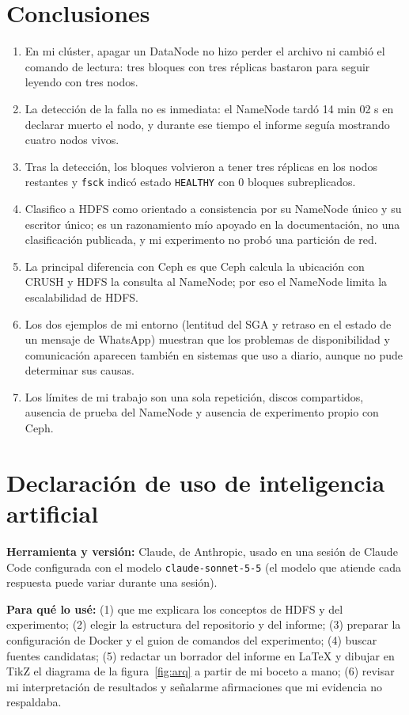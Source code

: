 \documentclass[11pt,a4paper]{article}
\begin{document}
\section{Conclusiones}
\begin{enumerate}
  \item En mi clúster, apagar un DataNode no hizo perder el archivo ni cambió el comando de lectura: tres bloques con tres réplicas bastaron para seguir leyendo con tres nodos.
  \item La detección de la falla no es inmediata: el NameNode tardó 14 min 02 s en declarar muerto el nodo, y durante ese tiempo el informe seguía mostrando cuatro nodos vivos.
  \item Tras la detección, los bloques volvieron a tener tres réplicas en los nodos restantes y \texttt{fsck} indicó estado \texttt{HEALTHY} con 0 bloques subreplicados.
  \item Clasifico a HDFS como orientado a consistencia por su NameNode único y su escritor único; es un razonamiento mío apoyado en la documentación, no una clasificación publicada, y mi experimento no probó una partición de red.
  \item La principal diferencia con Ceph es que Ceph calcula la ubicación con CRUSH y HDFS la consulta al NameNode; por eso el NameNode limita la escalabilidad de HDFS.
  \item Los dos ejemplos de mi entorno (lentitud del SGA y retraso en el estado de un mensaje de WhatsApp) muestran que los problemas de disponibilidad y comunicación aparecen también en sistemas que uso a diario, aunque no pude determinar sus causas.
  \item Los límites de mi trabajo son una sola repetición, discos compartidos, ausencia de prueba del NameNode y ausencia de experimento propio con Ceph.
\end{enumerate}

\section{Declaración de uso de inteligencia artificial}
\textbf{Herramienta y versión:} Claude, de Anthropic, usado en una sesión de Claude Code configurada con el modelo \texttt{claude-sonnet-5-5} (el modelo que atiende cada respuesta puede variar durante una sesión). 

\textbf{Para qué lo usé:} (1) que me explicara los conceptos de HDFS y del experimento; (2) elegir la estructura del repositorio y del informe; (3) preparar la configuración de Docker y el guion de comandos del experimento; (4) buscar fuentes candidatas; (5) redactar un borrador del informe en LaTeX y dibujar en TikZ el diagrama de la figura~\ref{fig:arq} a partir de mi boceto a mano; (6) revisar mi interpretación de resultados y señalarme afirmaciones que mi evidencia no respaldaba.
\end{document}
